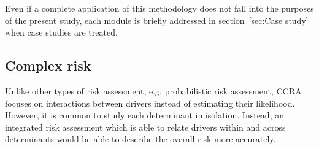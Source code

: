 Even if a complete application of this methodology does not fall into the purposes of the present study, each module is briefly addressed in section~\ref{sec:Case study} when case studies are treated.



\subsection{Complex risk}
\label{sec:Complex risk}
Unlike other types of risk assessment, e.g. probabilistic risk assessment, \gls{CCRA} focuses on interactions between \glspl{driver} instead of estimating their likelihood.\cite[20-21]{2017GIZRiskSupplement} However, it is common to study each \gls{determinant} in isolation. Instead, an integrated risk assessment which is able to relate \glspl{driver} within and across \glspl{determinant} would be able to describe the overall \gls{risk} more accurately.\cite[145-147]{2023IPCCClimateChange}

